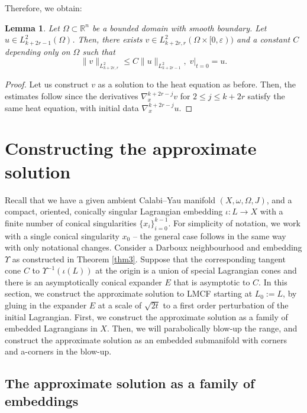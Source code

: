 \documentclass[10pt, a4paper]{article}
\theoremstyle{plain}%
\newtheorem{lem}[theorem]{Lemma}
\theoremstyle{definition}
\numberwithin{figure}{section}
\numberwithin{equation}{section}
\newcommand{\bR}{\mathbb{R}}
\newcommand{\ep}{\varepsilon}
\begin{document}
Therefore, we obtain:
\begin{lem}\label{lem_extensionoftrace}
	Let $\Omega \subset \bR^n$ be a bounded domain with smooth boundary. Let $u\in L^2_{k+2r-1}(\Omega)$. Then, there exists $v\in L^2_{k+2r,r}(\Omega\times[0,\ep))$ and a constant $C$ depending only on $\Omega$ such that \[
	\|v\|_{L^2_{k+2r,r}}\leq C\|u\|_{L^2_{k+2r-1}},\; v|_{t=0}=u.
	\]
\end{lem}
\begin{proof}
	Let us construct $v$ as a solution to the heat equation as before. Then, the estimates follow since the derivatives $\nabla^{k+2r-j}_xv$ for $2\leq j\leq k+2r$ satisfy the same heat equation, with initial data $\nabla^{k+2r-j}_xu$. 
\end{proof}


\section{Constructing the approximate solution}\label{sec_approxsol}
 
 Recall that we have a given ambient Calabi--Yau manifold $(X,\omega,\Omega, J)$, and a compact, oriented, conically singular Lagrangian embedding $\iota: L \rightarrow X$ with a finite number of conical singularities $\{x_i\}_{i=0}^{k-1}$. For simplicity of notation, we work with a single conical singularity $x_0$ -- the general case follows in the same way with only notational changes. Consider a Darboux neighbourhood and embedding $\Upsilon$ as constructed in Theorem \ref{thm3}. Suppose that the corresponding tangent cone $C$ to $\Upsilon^{-1}(\iota(L))$ at the origin is a union of special Lagrangian cones and there is an asymptotically conical expander $E$ that is asymptotic to $C$. In this section, we construct the approximate solution to LMCF starting at $L_0:=L$, by gluing in the expander $E$ at a scale of $\sqrt{2t}$ to a first order perturbation of the initial Lagrangian. First, we construct the approximate solution as a family of embedded Lagrangians in $X$. Then, we will parabolically blow-up the range, and construct the approximate solution as an embedded submanifold with corners and a-corners in the blow-up.
 \subsection{The approximate solution as a family of embeddings}\label{subsec_approxsolutionfamily}
 
\end{document}
